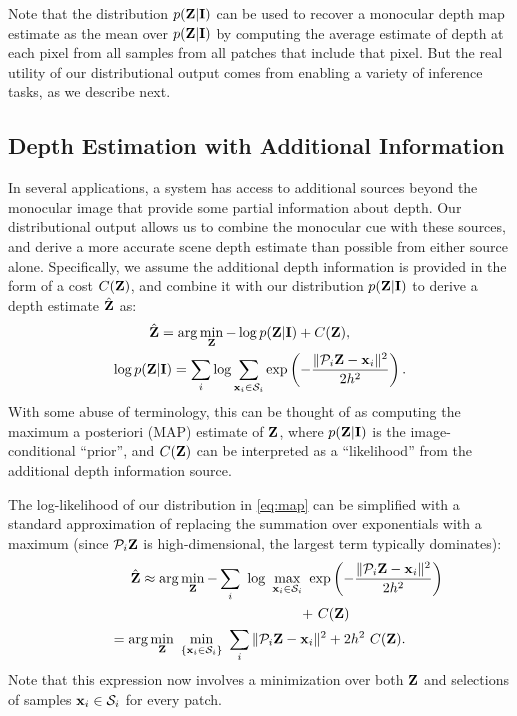 \documentclass[10pt,twocolumn,letterpaper]{article}
\begin{document}
Note that the distribution $p(\mathbf{Z}|\mathbf{I})$ can be used to recover a monocular depth map estimate as the mean over $p(\mathbf{Z}|\mathbf{I})$ by computing the average estimate of depth at each pixel from all samples from all patches that include that pixel. But the real utility of our distributional output comes from enabling a variety of inference tasks, as we describe next.

\subsection{Depth Estimation with Additional Information}
\label{sec:addinf}

In several applications, a system has access to additional sources beyond the monocular image that provide some partial information about depth. Our distributional output allows us to combine the monocular cue with these sources, and derive a more accurate scene depth estimate  than possible from either source alone. Specifically, we assume the additional depth information is provided in the form of a cost $C(\mathbf{Z})$, and combine it with our distribution $p(\mathbf{Z}|\mathbf{I})$ to derive a depth estimate $\hat{\mathbf{Z}}$ as:
\begin{eqnarray}
  \label{eq:map}
  \hat{\mathbf{Z}}=\arg \min_{\mathbf{Z}} -\log p(\mathbf{Z}|\mathbf{I}) + C(\mathbf{Z}),\qquad\qquad\notag\\
  \log p(\mathbf{Z}|\mathbf{I})=\sum_i\log\sum_{\mathbf{x}{}_i\in\mathcal{S}_i}\exp\left(-\frac{\|\mathcal{P}_i{}\mathbf{Z} - \mathbf{x}{}_i\|^2}{2h^2}\right).
\end{eqnarray}
With some abuse of terminology, this can be thought of as computing the maximum a posteriori (MAP) estimate of $\mathbf{Z}$, where $p(\mathbf{Z}|\mathbf{I})$ is the image-conditional ``prior'', and $C(\mathbf{Z})$ can be interpreted as a ``likelihood'' from the additional depth information source.

The log-likelihood of our distribution in \eqref{eq:map} can be simplified with a standard approximation of replacing the summation over exponentials with a maximum (since $\mathcal{P}_i{}\mathbf{Z}$ is high-dimensional, the largest term typically dominates):
\begin{eqnarray}
  \label{eq:mapsimp}
  \hat{\Z}\approx \arg \min_{\Z} - \sum_i~\log~\max_{\patch{}_i\in\Phi_i}~\exp\left(- \frac{\|\crop{}\Z - \patch{}_i\|^2}{2h^2}\right)\hspace{-3em}~\notag\\+ ~C(\Z)\qquad\qquad \notag\\
   =\arg \min_{\Z}~\min_{\{\patch_i \in \Phi_i\}}~\sum_i \| \crop{}\Z - \patch{}_i\|^2 + 2h^2~C(\Z).
\end{eqnarray}
Note that this expression now involves a minimization over both $\mathbf{Z}$ and selections of samples $\mathbf{x}{}_i \in \mathcal{S}_i$ for every patch.
\end{document}
